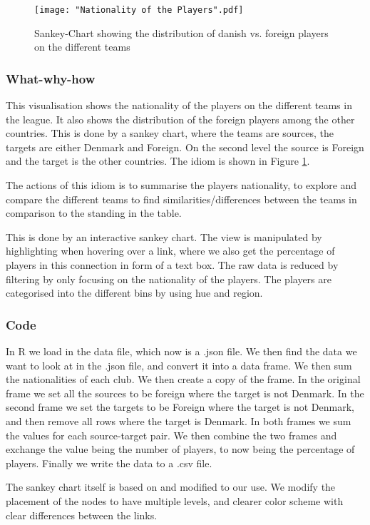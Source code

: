 \documentclass[Report.tex]{subfiles}
\begin{document}
\begin{figure}
\center
\texttt{[image: "Nationality of the Players".pdf]}
\caption{Sankey-Chart showing the distribution of danish vs. foreign players on the different teams}
\label{Fig:Nationality}
\end{figure}


\subsubsection{What-why-how}
This visualisation shows the nationality of the players on the different teams in the league. It also shows the distribution of the foreign players among the other countries. This is done by a sankey chart, where the teams are sources, the targets are either Denmark and Foreign. On the second level the source is Foreign and the target is the other countries. The idiom is shown in Figure \ref{Fig:Nationality}.

The actions of this idiom is to summarise the players nationality, to explore and compare the different teams to find similarities/differences between the teams in comparison to the standing in the table. 

This is done by an interactive sankey chart. The view is manipulated by highlighting when hovering over a link, where we also get the percentage of players in this connection in form of a text box. The raw data is reduced by filtering by only focusing on the nationality of the players. The players are categorised into the different bins by using hue and region.

\subsubsection{Code}
In R we load in the data file, which now is a .json file. We then find the data we want to look at in the .json file, and convert it into a data frame. We then sum the nationalities of each club. We then create a copy of the frame. In the original frame we set all the sources to be foreign where the target is not Denmark. In the second frame we set the targets to be Foreign where the target is not Denmark, and then remove all rows where the target is Denmark. In both frames we sum the values for each source-target pair. We then combine the two frames and exchange the value being the number of players, to now being the percentage of players. Finally we write the data to a .csv file.

The sankey chart itself is based on \cite{Sankey} and modified to our use. We modify the placement of the nodes to have multiple levels, and clearer color scheme with clear differences between the links.
\end{document}
